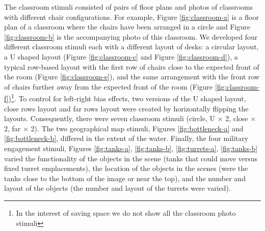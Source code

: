 \documentclass[11pt,letterpaper]{article}
\begin{document}
The classroom stimuli consisted of pairs of floor plans and photos of classrooms with different chair configurations. For example, Figure \ref{fig:classroom-a} is a floor plan of a classroom where the chairs have been arranged in a circle and Figure \ref{fig:classroom-b} is the accompanying photo of this classroom. We developed four different classroom stimuli each with a different layout of desks: a circular layout, a U shaped layout (Figure \ref{fig:classroom-c} and Figure \ref{fig:classroom-d}), a typical row-based layout with the first row of chairs close to the expected front of the room (Figure \ref{fig:classroom-e}), and the same arrangement with the front row of chairs further away from the expected front of the room (Figure \ref{fig:classroom-f})\footnote{In the interest of saving space we do not show all the classroom photo stimuli}. To control for left-right bias effects, two versions of the U shaped layout, close rows layout and far rows layout were created by horizontally flipping the layouts. Consequently, there were seven classroom stimuli (circle, U $\times$ 2, close $\times$ 2, far $\times$ 2).  The two geographical map stimuli, Figures \ref{fig:bottleneck-a} and \ref{fig:bottleneck-b}, differed in the extent of the water.  Finally, the four military engagement stimuli, Figures \ref{fig:tanks-a}, \ref{fig:tanks-b}, \ref{fig:turrets-a}, \ref{fig:tanks-b} varied the functionality of the objects in the scene (tanks that could move versus fixed turret emplacements), the location of the objects in the scenes (were the tanks close to the bottom of the image or near the top), and the number and layout of the objects (the number and layout of the turrets were varied). 
\end{document}
